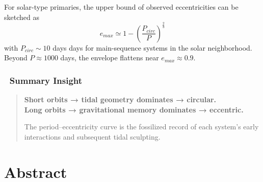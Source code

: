 \documentclass[
  letterpaper,
]{book}
\begin{document}
For solar-type primaries, the upper bound of observed eccentricities can
be sketched as \[
e_{max} \simeq 1 - \left(\frac{P_{circ}}{P}\right)^\frac{2}{3}
\] with \(P_{circ} \sim 10\) days days for main-sequence systems in the
solar neighborhood.\\
Beyond \(P \approx 1000\) days, the envelope flattens near
\(e_{max} \approx 0.9\).

\subsection{🧭 Summary Insight}\label{summary-insight}

\begin{quote}
\textbf{Short orbits → tidal geometry dominates → circular.}\\
\textbf{Long orbits → gravitational memory dominates → eccentric.}

The period--eccentricity curve is the fossilized record of each system's
early interactions and subsequent tidal sculpting.
\end{quote}

\chapter{Abstract}\label{abstract-44}
\end{document}
